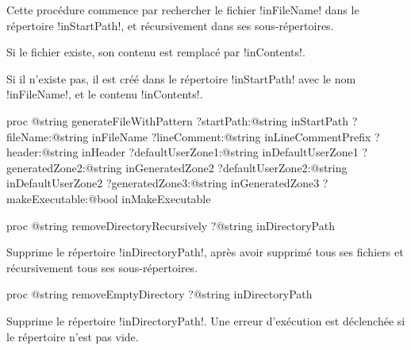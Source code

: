 Cette procédure commence par rechercher le fichier \ggs!inFileName! dans le répertoire \ggs!inStartPath!, et récursivement dans ses sous-répertoires.

Si le fichier existe, son contenu est remplacé par \ggs!inContents!.

Si il n'existe pas, il est créé dans le répertoire \ggs!inStartPath! avec le nom \ggs!inFileName!, et le contenu \ggs!inContents!.










\begin{galgasbox}
proc @string generateFileWithPattern
   ?startPath:@string inStartPath
   ?fileName:@string inFileName
   ?lineComment:@string inLineCommentPrefix
   ?header:@string inHeader
   ?defaultUserZone1:@string inDefaultUserZone1
   ?generatedZone2:@string inGeneratedZone2
   ?defaultUserZone2:@string inDefaultUserZone2
   ?generatedZone3:@string inGeneratedZone3
   ?makeExecutable:@bool inMakeExecutable
\end{galgasbox}








\begin{galgasbox}
proc @string removeDirectoryRecursively ?@string inDirectoryPath
\end{galgasbox}

Supprime le répertoire \ggs!inDirectoryPath!, après avoir supprimé tous ses fichiers et récursivement tous ses sous-répertoires.









\begin{galgasbox}
proc @string removeEmptyDirectory ?@string inDirectoryPath
\end{galgasbox}

Supprime le répertoire \ggs!inDirectoryPath!. Une erreur d'exécution est déclenchée si le répertoire n'est pas vide.


